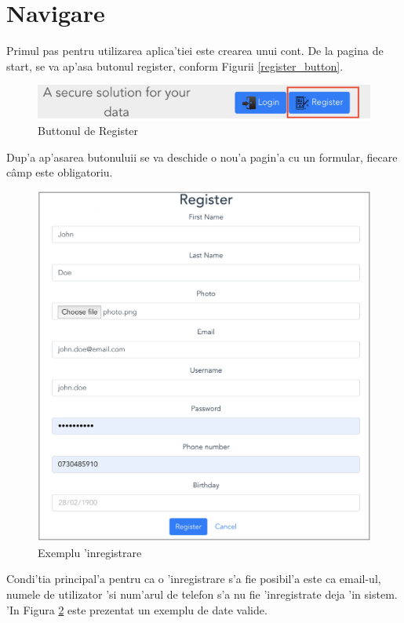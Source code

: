 \documentclass[12pt,a4paper,twoside]{report}
\begin{document}
\section{Navigare}
Primul  pas pentru utilizarea aplica'tiei este crearea unui cont. De la pagina de start, se va ap'asa butonul register, conform Figurii \ref{register_button}.
\begin{figure}[H]
\begin{center}
\advance\leftskip-3cm
\advance\rightskip-3cm
\includegraphics[keepaspectratio=true,scale=0.40]{img/register_button.png}
\caption{Buttonul de Register}
\label{register_ button}
\end{center}
\end{figure} 
Dup'a ap'asarea butonuluii se va deschide o nou'a pagin'a cu un formular, fiecare câmp este obligatoriu. 
\begin{figure}[H]
\begin{center}
\advance\leftskip-3cm
\advance\rightskip-3cm
\includegraphics[keepaspectratio=true,scale=0.35]{img/bit_register.png}
\caption{Exemplu 'inregistrare}
\label{bit_register}
\end{center}
\end{figure} 
Condi'tia principal'a pentru ca o 'inregistrare s'a fie posibil'a este ca email-ul, numele de utilizator 'si num'arul de telefon s'a nu fie 'inregistrate deja 'in sistem.
'In Figura \ref{bit_register} este prezentat un exemplu de date valide.
\end{document}
